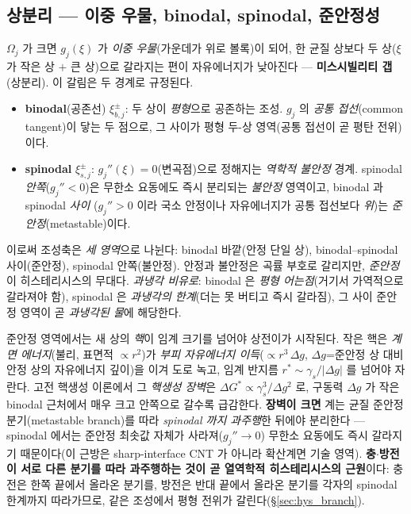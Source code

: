 \documentclass[11pt,a4paper]{article}
\begin{document}
\subsection{상분리 — 이중 우물, binodal, spinodal, 준안정성}
$\Omega_j$ 가 크면 $g_j(\xi)$ 가 \emph{이중 우물}(가운데가 위로 볼록)이 되어, 한 균질 상보다 두 상($\xi$ 가
작은 상 $+$ 큰 상)으로 갈라지는 편이 자유에너지가 낮아진다 — \textbf{미스시빌리티 갭}(상분리). 이 갈림은 두
경계로 규정된다.
\begin{itemize}[leftmargin=1.4em,itemsep=2pt]
\item \textbf{binodal}(공존선) $\xi_{b,j}^\pm$: 두 상이 \emph{평형}으로 공존하는 조성. $g_j$ 의 \emph{공통
  접선}(common tangent)이 닿는 두 점으로, 그 사이가 평형 두-상 영역(공통 접선이 곧 평탄 전위)이다.
\item \textbf{spinodal} $\xi_{s,j}^\pm$: $g_j''(\xi)=0$(변곡점)으로 정해지는 \emph{역학적 불안정} 경계. spinodal
  \emph{안쪽}($g_j''<0$)은 무한소 요동에도 즉시 분리되는 \emph{불안정} 영역이고, binodal 과 spinodal \emph{사이}
  ($g_j''>0$ 이라 국소 안정이나 자유에너지가 공통 접선보다 \emph{위})는 \emph{준안정}(metastable)이다.
\end{itemize}
이로써 조성축은 \emph{세 영역}으로 나뉜다: binodal 바깥(안정 단일 상), binodal--spinodal 사이(준안정), spinodal
안쪽(불안정). 안정과 불안정은 곡률 부호로 갈리지만, \emph{준안정}이 히스테리시스의 무대다. \emph{과냉각 비유로}:
binodal 은 \emph{평형 어는점}(거기서 가역적으로 갈라져야 함), spinodal 은 \emph{과냉각의 한계}(더는 못 버티고
즉시 갈라짐), 그 사이 준안정 영역이 곧 \emph{과냉각된 물}에 해당한다.

준안정 영역에서는 새 상의 \emph{핵}이 임계 크기를 넘어야 상전이가 시작된다. 작은 핵은 \emph{계면 에너지}(불리,
표면적 $\propto r^2$)가 \emph{부피 자유에너지 이득}($\propto r^3\,\Delta g$, $\Delta g$=준안정 상 대비 안정 상의
자유에너지 깊이)을 이겨 도로 녹고, 임계 반지름 $r^\ast\sim\gamma_s/|\Delta g|$ 를 넘어야 자란다. 고전 핵생성
이론에서 그 \emph{핵생성 장벽}은 $\Delta G^\ast\propto\gamma_s^3/\Delta g^2$ 로, 구동력 $\Delta g$ 가 작은 binodal
근처에서 매우 크고 안쪽으로 갈수록 급감한다. \textbf{장벽이 크면} 계는 균질 준안정 분기(metastable branch)를 따라
\emph{spinodal 까지 과주행}한 뒤에야 분리한다 — spinodal 에서는 준안정 최솟값 자체가 사라져($g_j''\to0$) 무한소
요동에도 즉시 갈라지기 때문이다(이 근방은 sharp-interface CNT 가 아니라 확산계면 기술 영역). \textbf{충$\cdot$방전이
서로 다른 분기를 따라 과주행하는 것이 곧 열역학적 히스테리시스의 근원}이다: 충전은 한쪽 끝에서 올라온 분기를,
방전은 반대 끝에서 올라온 분기를 각자의 spinodal 한계까지 따라가므로, 같은 조성에서 평형 전위가 갈린다(\S\ref{sec:hys_branch}).
\end{document}
